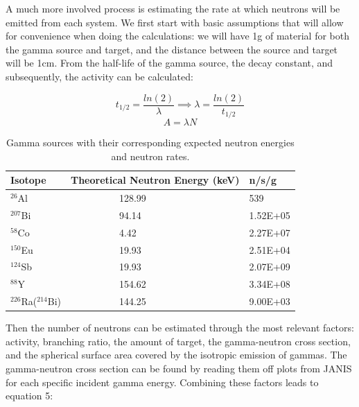 \documentclass[%
12pt,
twoside,
reprint,
amsmath,amssymb,
aps,
]{article}
\begin{document}
	\par A much more involved process is estimating the rate at which neutrons will be emitted from each system. We first start with basic assumptions that will allow for convenience when doing the calculations: we will have 1g of material for both the gamma source and target, and the distance between the source and target will be 1cm. From the half-life of the gamma source, the decay constant, and subsequently, the activity can be calculated:
	
	\begin{equation*}
	t_{1/2} = \frac{ln(2)}{\lambda} \implies \lambda = \frac{ln(2)}{t_{1/2}}
	\end{equation*}
	\begin{equation*}
	A = \lambda N
	\end{equation*}
	
	\begin{table}
		\begin{center}
			\scriptsize
			\begin{tabular}{p{3.1cm} p{3.1cm} p{3.1cm}}
				\hline
				\textbf{Isotope} & \textbf{Theoretical Neutron Energy (keV)} & \textbf{n/s/g} \\ \hline
				$^{26}$Al &\ \ \ \ \ \ \ \ \ \ 128.99 & 539 \\ \hline
				$^{207}$Bi &\ \ \ \ \ \ \ \ \ \ 94.14 & 1.52E+05 \\ \hline
				$^{58}$Co &\ \ \ \ \ \ \ \ \ \ 4.42 & 2.27E+07 \\ \hline
				$^{150}$Eu &\ \ \ \ \ \ \ \ \ \ 19.93 & 2.51E+04 \\ \hline
				$^{124}$Sb &\ \ \ \ \ \ \ \ \ \ 19.93 & 2.07E+09 \\ \hline
				$^{88}$Y &\ \ \ \ \ \ \ \ \ \ 154.62 & 3.34E+08 \\ \hline
				$^{226}$Ra($^{214}$Bi) &\ \ \ \ \ \ \ \ \ \ 144.25 & 9.00E+03 \\ \hline
			\end{tabular}
			\caption{Gamma sources with their corresponding expected neutron energies and neutron rates.}
		\end{center}
	\end{table}
	
	\noindent Then the number of neutrons can be estimated through the most relevant factors: activity, branching ratio, the amount of target, the gamma-neutron cross section, and the spherical surface area covered by the isotropic emission of gammas. The gamma-neutron cross section can be found by reading them off plots from JANIS for each specific incident gamma energy. Combining these factors leads to equation 5:
	
\end{document}
